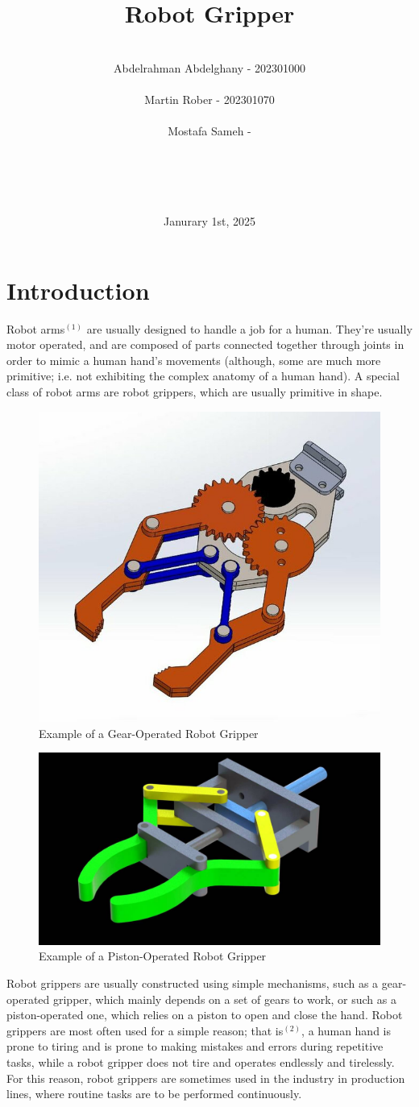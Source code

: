\documentclass{article}
\title{Robot Gripper}
\author{ \\ Abdelrahman Abdelghany - 202301000 \\ \\ Martin Rober - 202301070 \\ \\ Mostafa Sameh - \\ \\ \\ \\ \\  }
\date{Janurary 1st, 2025}
\begin{document}
\maketitle

\newpage
\section*{Introduction}
Robot arms$^{(1)}$ are usually designed to handle a job for a human. They're usually motor operated,
and are composed of parts connected together through joints in order to mimic a human hand's movements
(although, some are much more primitive; i.e. not exhibiting the complex anatomy of a human hand).
\newline \newline
A special class of robot arms are robot grippers, which are usually primitive in shape.
\begin{figure}[h]
    \centering
    \includegraphics[width=0.5\linewidth]{Images/gear-operated_robot_gripper.jpg}
    \caption{Example of a Gear-Operated Robot Gripper}
    \label{fig:f1}
\end{figure}
\begin{figure}[h]
    \centering
    \includegraphics[width=0.5\linewidth]{Images/piston-operated_robot_gripper.jpg}
    \caption{Example of a Piston-Operated Robot Gripper}
    \label{fig:f2}
\end{figure}
Robot grippers are usually constructed using simple mechanisms, such as a gear-operated gripper,
which mainly depends on a set of gears to work, or such as a piston-operated one, which relies
on a piston to open and close the hand.
\newline \newline
Robot grippers are most often used for a simple reason; that is$^{(2)}$, a human hand is prone to tiring
and is prone to making mistakes and errors during repetitive tasks, while a robot gripper does 
not tire and operates endlessly and tirelessly. For this reason, robot grippers are sometimes used
in the industry in production lines, where routine tasks are to be performed continuously.
\end{document}

